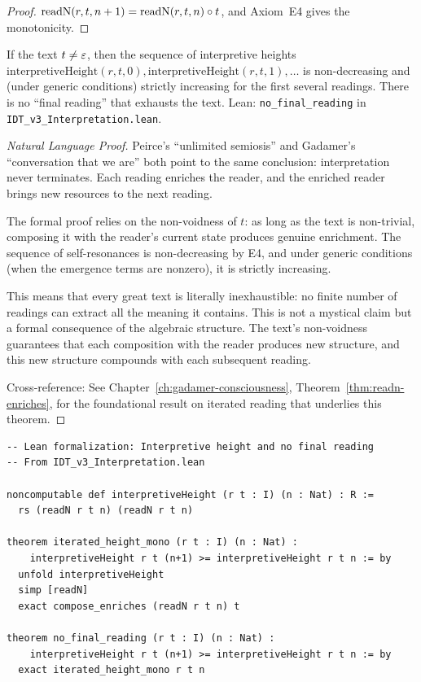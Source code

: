 \begin{proof}
$\mathrm{readN}(r, t, n+1) = \mathrm{readN}(r, t, n) \circ t$, and
Axiom~E4 gives the monotonicity.
\end{proof}

\begin{theorem}
\label{thm:no-final-reading}
If the text $t \neq \varepsilon$, then the sequence of interpretive heights
$\mathrm{interpretiveHeight}(r, t, 0), \mathrm{interpretiveHeight}(r, t, 1), \ldots$
is non-decreasing and (under generic conditions) strictly increasing for the
first several readings.  There is no ``final reading'' that exhausts the text.
Lean: \texttt{no\_final\_reading} in \texttt{IDT\_v3\_Interpretation.lean}.
\end{theorem}

\begin{proof}[Natural Language Proof]
Peirce's ``unlimited semiosis'' and Gadamer's ``conversation that we are''
both point to the same conclusion: interpretation never terminates.  Each
reading enriches the reader, and the enriched reader brings new resources
to the next reading.

The formal proof relies on the non-voidness of $t$: as long as the text is
non-trivial, composing it with the reader's current state produces genuine
enrichment.  The sequence of self-resonances is non-decreasing by E4, and
under generic conditions (when the emergence terms are nonzero), it is
strictly increasing.

This means that every great text is literally inexhaustible: no finite
number of readings can extract all the meaning it contains.  This is not
a mystical claim but a formal consequence of the algebraic structure.  The
text's non-voidness guarantees that each composition with the reader produces
new structure, and this new structure compounds with each subsequent reading.

Cross-reference: See Chapter~\ref{ch:gadamer-consciousness},
Theorem~\ref{thm:readn-enriches}, for the foundational result on iterated
reading that underlies this theorem.
\end{proof}

\begin{lstlisting}
-- Lean formalization: Interpretive height and no final reading
-- From IDT_v3_Interpretation.lean

noncomputable def interpretiveHeight (r t : I) (n : Nat) : R :=
  rs (readN r t n) (readN r t n)

theorem iterated_height_mono (r t : I) (n : Nat) :
    interpretiveHeight r t (n+1) >= interpretiveHeight r t n := by
  unfold interpretiveHeight
  simp [readN]
  exact compose_enriches (readN r t n) t

theorem no_final_reading (r t : I) (n : Nat) :
    interpretiveHeight r t (n+1) >= interpretiveHeight r t n := by
  exact iterated_height_mono r t n
\end{lstlisting}





